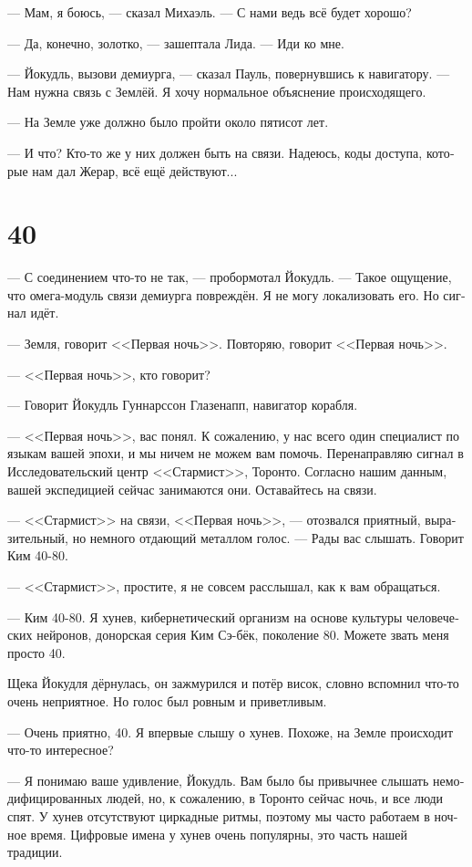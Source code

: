 \documentclass[a4paper,12pt,fleqn]{book}\usepackage{polyglossia}\setdefaultlanguage[babelshorthands=true]{russian}\setotherlanguage{english}\defaultfontfeatures{Ligatures=TeX,Mapping=tex-text}\usepackage{xcolor}\newcommand{\ml}[3]{#2}
\newcommand{\asterism}{\vspace{1em}{\centering\Large\bfseries$\ast~\ast~\ast$\par}\vspace{1em}}
\begin{document}
--- Мам, я боюсь, --- сказал Михаэль.
--- С нами ведь всё будет хорошо?

--- Да, конечно, золотко, --- зашептала Лида.
--- Иди ко мне.

--- Йокудль, вызови демиурга, --- сказал Пауль, повернувшись к навигатору.
--- Нам нужна связь с Землёй.
Я хочу нормальное объяснение происходящего.

--- На Земле уже должно было пройти около пятисот лет.

--- И что?
Кто-то же у них должен быть на связи.
Надеюсь, коды доступа, которые нам дал Жерар, всё ещё действуют...

\section{40}

--- С соединением что-то не так, --- пробормотал Йокудль.
--- Такое ощущение, что омега-модуль связи демиурга повреждён.
Я не могу локализовать его.
Но сигнал идёт.

\asterism

--- Земля, говорит <<Первая ночь>>.
Повторяю, говорит <<Первая ночь>>.

--- <<Первая ночь>>, кто говорит?

--- Говорит Йокудль Гуннарссон Глазенапп, навигатор корабля.

--- <<Первая ночь>>, вас понял.
К сожалению, у нас всего один специалист по языкам вашей эпохи, и мы ничем не можем вам помочь.
Перенаправляю сигнал в Исследовательский центр <<Стармист>>, Торонто.
Согласно нашим данным, вашей экспедицией сейчас занимаются они.
Оставайтесь на связи.

--- <<Стармист>> на связи, <<Первая ночь>>, --- отозвался приятный, выразительный, но немного отдающий металлом голос.
--- Рады вас слышать.
Говорит Ким 40-80.

--- <<Стармист>>, простите, я не совсем расслышал, как к вам обращаться.

--- Ким 40-80.
Я хунев, кибернетический организм на основе культуры человеческих нейронов, донорская серия Ким Сэ-бёк, поколение 80. %
Можете звать меня просто 40.

Щека Йокудля дёрнулась, он зажмурился и потёр висок, словно вспомнил что-то очень неприятное.
Но голос был ровным и приветливым.

--- Очень приятно, 40.
Я впервые слышу о хунев.
Похоже, на Земле происходит что-то интересное?

--- Я понимаю ваше удивление, Йокудль.
Вам было бы привычнее слышать немодифицированных людей, но, к сожалению, в Торонто сейчас ночь, и все люди спят.
У хунев отсутствуют циркадные ритмы, поэтому мы часто работаем в ночное время.
Цифровые имена у хунев очень популярны, это часть нашей традиции.
\end{document}
